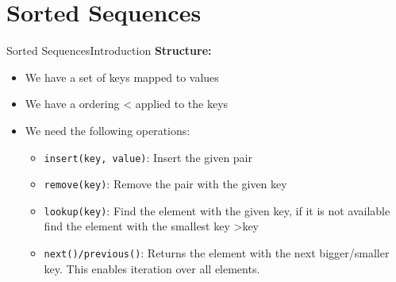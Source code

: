 \section{Sorted Sequences}

\begin{frame}{Sorted Sequences}{Introduction}
  \textbf{Structure:}
  \begin{itemize}
    \item<2->
      We have a set of {\color{Mittel-Blau}keys} mapped to
      {\color{Mittel-Blau}values}
    \item<3->
      We have a ordering {\color{Mittel-Blau}<} applied to the keys
    \item<4->
      We need the following operations:
      \begin{itemize}
      \item<5->{\color{Mittel-Blau}\texttt{insert(key, value)}}: Insert the given pair
      \item<6->{\color{Mittel-Blau}\texttt{remove(key)}}: Remove the pair with the given {\color{Mittel-Blau}key}
      \item<7->{\color{Mittel-Blau}\texttt{lookup(key)}}:  Find the element with the given {\color{Mittel-Blau}key},
        if it is not available find the element with the smallest key  {\color{Mittel-Blau}>key}
      \item<8->{\color{Mittel-Blau}\texttt{next()/previous()}}: Returns the element with the next bigger/smaller {\color{Mittel-Blau}key}. This enables iteration over all elements.    
      \end{itemize}  
  \end{itemize}
\end{frame}


